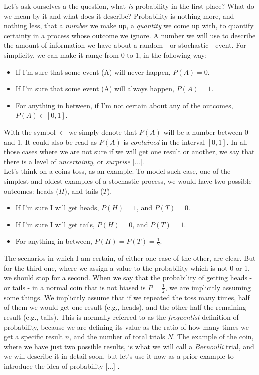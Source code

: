 \documentclass{book}
\begin{document}
\medskip

Let's ask ourselves a the question, what \textit{is} probability in the first place? What do we mean by it and what does it describe? Probability is nothing more, and nothing less, that a \textit{number} we make up, a \textit{quantity} we come up with, to quantify certainty in a process whose outcome we ignore. A number we will use to describe the amount of information we have about a random - or stochastic - event. For simplicity, we can make it range from 0 to 1, in the following way:

\begin{itemize}
\item If I'm sure that some event (A) will never happen, $P(A) = 0$.
\item If I'm sure that some event (A) will always happen,  $P(A) = 1$.
\item For anything in between, if I'm not certain about any of the outcomes, $P(A) \in [0, 1]$.
\end{itemize}

With the symbol $ \in$ we simply denote that $P(A)$ will be a number between 0 and 1. It could also be read as $P(A)$ is \textit{contained} in the interval $[0, 1]$. In all those cases where we are not sure if we will get one result or another, we say that there is a level of \textit{uncertainty}, or \textit{surprise} [...].\\

Let's think on a coins toss, as an example. To model such case, one of the simplest and oldest examples of a stochastic process, we would have two possible outcomes: heads ($H$), and tails ($T$).

\begin{itemize}
\item If I'm sure I will get heads, $P(H) = 1$, and $P(T) = 0$.
\item If I'm sure I will get tails, $P(H) = 0$, and $P(T) = 1$.
\item For anything in between, $P(H) = P(T) = \frac{1}{2}$.
\end{itemize}

The scenarios in which I am certain, of either one case of the other, are clear. But for the third one, where we assign a value to the probability which is not 0 or 1, we should stop for a second. When we say that the probability of getting heads - or tails - in a normal coin that is not biased is $P = \frac{1}{2}$, we are implicitly assuming some things. We implicitly assume that if we repeated the toss many times, half of them we would get one result (e.g., heads), and the other half the remaining result (e.g., tails). This is normally referred to as the \textit{frequentist} definition of probability, because we are defining its value as the ratio of how many times we get a specific result $n$, and the number of total trials $N$. The example of the coin, where we have just two possible results, is what we will call a \textit{Bernoulli} trial, and we will describe it in detail soon, but let's use it now as a prior example to introduce the idea of probability [...] .\\
\end{document}
